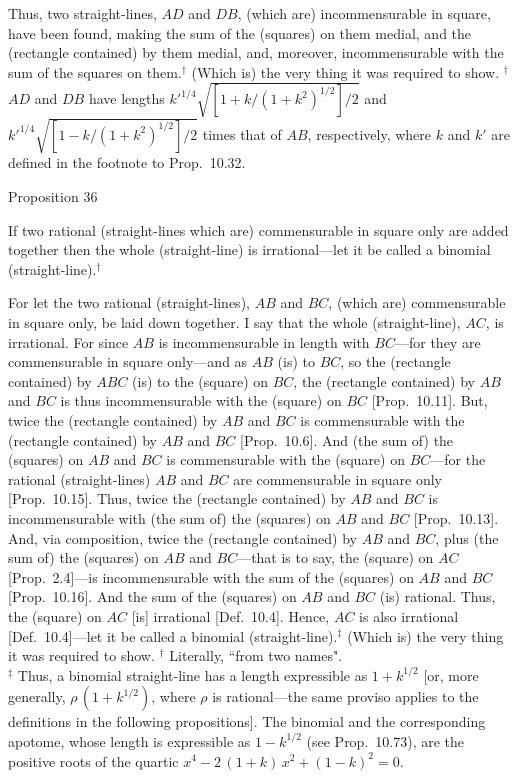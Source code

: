 Thus, two straight-lines, $AD$ and $DB$, (which are) incommensurable
in square, have been found, making the sum of the (squares) on them
medial, and the (rectangle contained) by them medial, and, moreover, 
incommensurable  with the sum of the squares on them.$^\dag$
 (Which is) the
very thing it was required to show.
{\footnotesize\noindent$^\dag$ $AD$ and $DB$ have lengths
$k'^{1/4}\sqrt{[1+k/(1+k^2)^{1/2}]/2}$ and  $k'^{1/4}\sqrt{[1-k/(1+k^2)^{1/2}]/2}$ times that of $AB$, respectively, where $k$ and $k'$
are defined in the footnote to Prop.~10.32.}


\begin{center}
{\large Proposition 36}
\end{center}

If two rational (straight-lines which are) commensurable
in square only are added together then the whole (straight-line) is irrational---let it
be called a binomial (straight-line).$^\dag$

\epsfysize=0.3in
\centerline{}

For let the two rational (straight-lines), $AB$ and $BC$, (which are)
commensurable in square only, be laid down together. I say that the
whole (straight-line), $AC$, is irrational.
For since $AB$ is incommensurable in length with $BC$---for they
are commensurable in square only---and as $AB$ (is) to $BC$, so
the (rectangle contained) by $ABC$ (is) to the (square) on $BC$, the (rectangle contained)
by $AB$ and $BC$ is thus incommensurable with the
(square) on $BC$ [Prop.~10.11]. But,
twice the (rectangle contained) by $AB$ and $BC$ is commensurable
with the (rectangle contained) by $AB$ and $BC$ [Prop.~10.6]. And (the sum of) the (squares) on
$AB$ and $BC$
 is commensurable with the (square) on $BC$---for the rational (straight-lines) $AB$ and $BC$ are commensurable in square only [Prop.~10.15].
Thus, twice the (rectangle contained) by $AB$ and $BC$ is incommensurable
with (the sum of) the (squares) on $AB$ and $BC$ [Prop.~10.13]. And, via composition, twice
the (rectangle contained) by $AB$ and $BC$, plus (the sum of) the (squares)
on $AB$ and $BC$---that is to say, the (square) on $AC$ [Prop.~2.4]---is incommensurable with the
sum of the (squares) on $AB$ and $BC$ [Prop.~10.16]. And the sum of the (squares) on $AB$ and $BC$ (is) rational. Thus, the (square) on $AC$ [is]
irrational [Def.~10.4]. Hence, $AC$
is also irrational [Def.~10.4]---let it be called
a binomial (straight-line).$^\ddag$  (Which is) the very thing it was required to show.
{\footnotesize\noindent$^\dag$ Literally, ``from two names".\\[0.5ex]
$^\ddag$ Thus, a binomial straight-line has a length
expressible as  $1 +k^{1/2}$ [or, more generally, $\rho\,(1+k^{1/2})$, where $\rho$ is rational---the same proviso applies to the definitions in the following propositions]. The binomial and the corresponding apotome, whose length is expressible as
$1-k^{1/2}$ (see Prop.~10.73), are
the positive roots of the quartic $x^4-2\,(1+k)\,x^2+ (1-k)^2 = 0$.}

